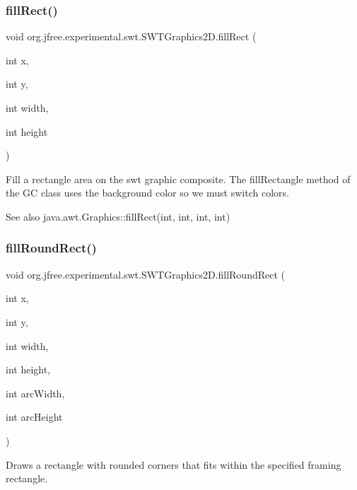 \subsubsection{\texorpdfstring{fill\+Rect()}{fillRect()}}
{\footnotesize\ttfamily void org.\+jfree.\+experimental.\+swt.\+S\+W\+T\+Graphics2\+D.\+fill\+Rect (\begin{DoxyParamCaption}\item[{int}]{x,  }\item[{int}]{y,  }\item[{int}]{width,  }\item[{int}]{height }\end{DoxyParamCaption})}

Fill a rectangle area on the swt graphic composite. The {\ttfamily fill\+Rectangle} method of the {\ttfamily GC} class uses the background color so we must switch colors. \begin{DoxySeeAlso}{See also}
java.\+awt.\+Graphics\+::fill\+Rect(int, int, int, int) 
\end{DoxySeeAlso}
\mbox{\label{classorg_1_1jfree_1_1experimental_1_1swt_1_1_s_w_t_graphics2_d_a7262e304a98d833a913e4ae3366c9be2}} 
\subsubsection{\texorpdfstring{fill\+Round\+Rect()}{fillRoundRect()}}
{\footnotesize\ttfamily void org.\+jfree.\+experimental.\+swt.\+S\+W\+T\+Graphics2\+D.\+fill\+Round\+Rect (\begin{DoxyParamCaption}\item[{int}]{x,  }\item[{int}]{y,  }\item[{int}]{width,  }\item[{int}]{height,  }\item[{int}]{arc\+Width,  }\item[{int}]{arc\+Height }\end{DoxyParamCaption})}

Draws a rectangle with rounded corners that fits within the specified framing rectangle.


